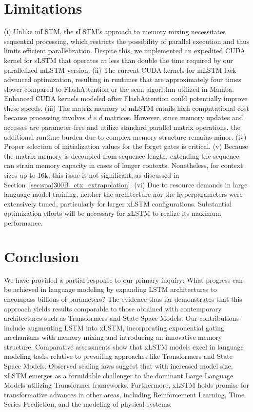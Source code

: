 \section{Limitations}

(i) Unlike mLSTM, the sLSTM’s approach to memory mixing necessitates sequential processing, which restricts the possibility of parallel execution and thus limits efficient parallelization. Despite this, we implemented an expedited CUDA kernel for sLSTM that operates at less than double the time required by our parallelized mLSTM version. (ii) The current CUDA kernels for mLSTM lack advanced optimization, resulting in runtimes that are approximately four times slower compared to FlashAttention or the scan algorithm utilized in Mamba. Enhanced CUDA kernels modeled after FlashAttention could potentially improve these speeds. (iii) The matrix memory of mLSTM entails high computational cost because processing involves $d \times d$ matrices. However, since memory updates and accesses are parameter-free and utilize standard parallel matrix operations, the additional runtime burden due to complex memory structure remains minor. (iv) Proper selection of initialization values for the forget gates is critical. (v) Because the matrix memory is decoupled from sequence length, extending the sequence can strain memory capacity in cases of longer contexts. Nonetheless, for context sizes up to 16k, this issue is not significant, as discussed in Section~\ref{sec:spaj300B_ctx_extrapolation}. (vi) Due to resource demands in large language model training, neither the architecture nor the hyperparameters were extensively tuned, particularly for larger xLSTM configurations. Substantial optimization efforts will be necessary for xLSTM to realize its maximum performance.

\section{Conclusion}
We have provided a partial response to our primary inquiry: What progress can be achieved in language modeling by expanding LSTM architectures to encompass billions of parameters? The evidence thus far demonstrates that this approach yields results comparable to those obtained with contemporary architectures such as Transformers and State Space Models. Our contributions include augmenting LSTM into xLSTM, incorporating exponential gating mechanisms with memory mixing and introducing an innovative memory structure. Comparative assessments show that xLSTM models excel in language modeling tasks relative to prevailing approaches like Transformers and State Space Models. Observed scaling laws suggest that with increased model size, xLSTM emerges as a formidable challenger to the dominant Large Language Models utilizing Transformer frameworks. Furthermore, xLSTM holds promise for transformative advances in other areas, including Reinforcement Learning, Time Series Prediction, and the modeling of physical systems.

